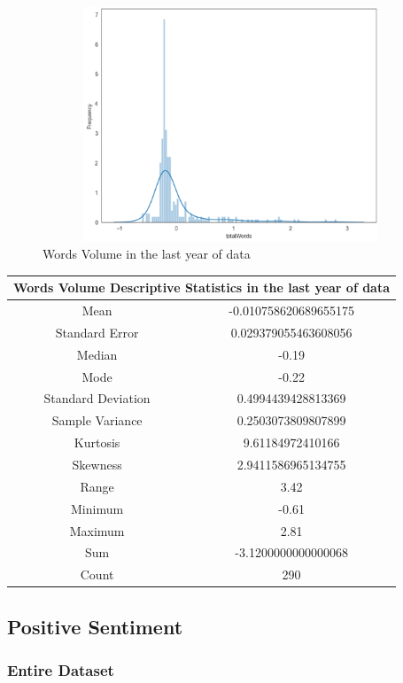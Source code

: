 \begin{figure}[h!]
\centering
\includegraphics[width=15cm,height=7cm,keepaspectratio]{resultsEvaluation/wordsDesc1.png}
\caption{Words Volume in the last year of data}
\label{fig:appendix_wordsDesc1}
\end{figure}
\begin{center}
\begin{tabular}{ c c }
\hline
\multicolumn{2}{|c|}{Words Volume Descriptive Statistics in the last year of data} \\
\hline
Mean & -0.010758620689655175 \\
Standard Error & 0.029379055463608056 \\
Median & -0.19 \\
Mode & -0.22 \\
Standard Deviation & 0.4994439428813369 \\
Sample Variance & 0.2503073809807899 \\
Kurtosis & 9.61184972410166 \\
Skewness & 2.9411586965134755 \\
Range & 3.42 \\
Minimum & -0.61 \\
Maximum & 2.81 \\
Sum & -3.1200000000000068 \\
Count & 290
\end{tabular}
\end{center}

\subsection{Positive Sentiment}

\subsubsection{Entire Dataset}

